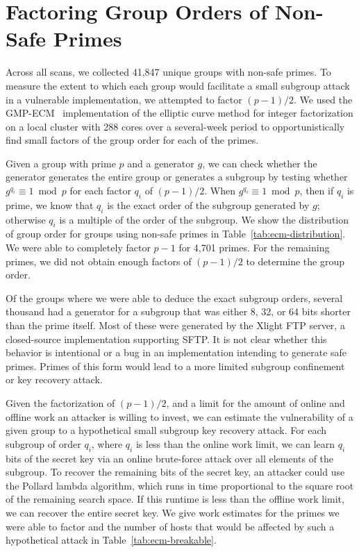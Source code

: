 
\section{Factoring Group Orders of Non-Safe Primes}
\label{sec:ecm}

Across all scans, we collected 41,847 unique groups with non-safe primes.
To measure the extent to which each group would facilitate a small subgroup
attack in a vulnerable implementation, we attempted to factor $(p-1)/2$. We
used the GMP-ECM~\cite{gmp-ecm-zimmerman-2012} implementation of the elliptic curve method for
integer factorization on a local cluster with 288 cores over a several-week
period to opportunistically find small factors of the group order for each of
the primes.


Given a group with prime $p$ and a generator $g$, we can check whether the
generator generates the entire group or generates a subgroup by testing whether
$g^{q_i} \equiv 1 \bmod p$ for each factor $q_i$ of $(p-1)/2$.  When $g^{q_i}
\equiv 1 \bmod p$, then if $q_i$ is prime, we know that $q_i$ is the exact
order of the subgroup generated by $g$; otherwise $q_i$ is a multiple of the
order of the subgroup. We show the distribution of group order for groups using
non-safe primes in Table~\ref{tab:ecm-distribution}.  We were able to
completely factor $p-1$ for 4,701 primes.  For the remaining primes, we
did not obtain enough factors of $(p-1)/2$ to determine the group order. 


Of the groups where we were able to deduce the exact subgroup orders, several
thousand had a generator for a subgroup that was either 8, 32, or 64 bits
shorter than the prime itself.  Most of these were generated by the Xlight FTP
server, a closed-source implementation supporting SFTP.  It is not clear
whether this behavior is intentional or a bug in an implementation intending to
generate safe primes.  Primes of this form would lead to a more limited
subgroup confinement or key recovery attack.

Given the factorization of $(p-1)/2$, and a limit for the amount of online and
offline work an attacker is willing to invest, we can estimate the
vulnerability of a given group to a hypothetical small subgroup key recovery
attack. For each subgroup of order $q_i$, where $q_i$ is less than the online
work limit, we can learn $q_i$ bits of the secret key via an online brute-force
attack over all elements of the subgroup. To recover the remaining bits of the
secret key, an attacker could use the Pollard lambda algorithm, which runs in
time proportional to the square root of the remaining search space. If this
runtime is less than the offline work limit, we can recover the entire secret
key. We give work estimates for the primes we were able to factor and the
number of hosts that would be affected by such a hypothetical attack in
Table~\ref{tab:ecm-breakable}.

